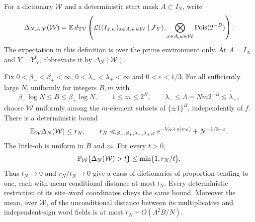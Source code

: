 For a dictionary $\mathcal W$ and a deterministic start mask $A\subset I_N$,
write
\begin{equation}\label{eq:typical-distance}
 \Delta_{N,A,Y}(\mathcal W)=
 \mathbb E\,d_{\mathrm{TV}}\left(\mathcal L((I_{x,w})_{x\in A,w\in\mathcal W}\mid\mathcal F_Y),
           \bigotimes_{x\in A,w\in\mathcal W}\operatorname{Pois}(2^{-B})\right).
\end{equation}
The expectation in this definition is over the prime environment only.
At $A=I_N$ and $Y=Y_N^\sharp$, abbreviate it by $\Delta_N(\mathcal W)$.

\begin{theorem}\label{thm:typical-dictionaries}
Fix $0<\beta_-<\beta_+<\infty$, $0<\lambda_-<\lambda_+<\infty$ and
$0<\varepsilon<1/3$. For all sufficiently large $N$, uniformly for integers $B,m$ with
\[
 \beta_-\log N\le B\le\beta_+\log N,\qquad
 1\le m\le2^B,\qquad \lambda_-\le\Lambda=Nm2^{-B}\le\lambda_+,
\]
choose $\mathcal W$ uniformly among the $m$-element subsets of
$\{\pm1\}^B$, independently of $f$. There is a deterministic bound
\begin{equation}\label{eq:typical-rate}
 \mathbb E_{\mathcal W}\Delta_N(\mathcal W)\le r_N,\qquad
 r_N\ll_{\beta_-,\beta_+,\lambda_-,\lambda_+,\varepsilon}
             e^{-V_N+o(\nu_N)}+N^{-1/3+\varepsilon}.
\end{equation}
The little-oh is uniform in $B$ and $m$. For every $t>0$,
\begin{equation}\label{eq:typical-markov}
 \mathbb P_{\mathcal W}\{\Delta_N(\mathcal W)>t\}\le \min\{1,r_N/t\}.
\end{equation}
Thus $t_N\to0$ and $r_N/t_N\to0$ give a class of dictionaries of
proportion tending to one, each with mean conditional distance at most
$t_N$. Every deterministic restriction of its site--word coordinates obeys the same
bound. Moreover the mean, over $\mathcal W$, of the unconditional
 distance between its multiplicative and independent-sign word fields
is at most $r_N+O(\Lambda^2B/N)$.
\end{theorem}
